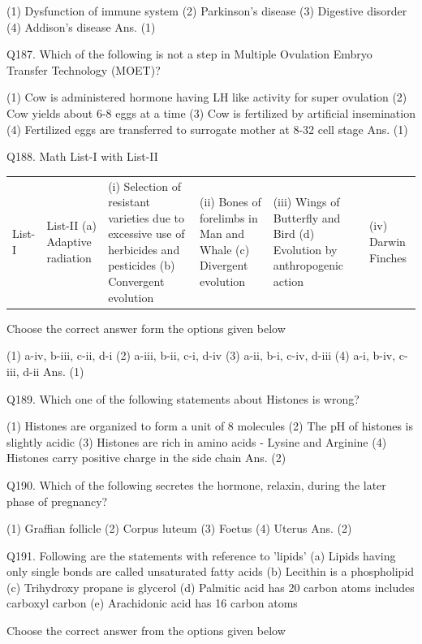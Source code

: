 \begin{enumerate}
(1) Dysfunction of immune system
(2) Parkinson's disease
(3) Digestive disorder
(4) Addison's disease
Ans. (1)

Q187. Which of the following is not a step in Multiple Ovulation Embryo Transfer Technology (MOET)?

(1) Cow is administered hormone having LH like activity for super ovulation
(2) Cow yields about 6-8 eggs at a time
(3) Cow is fertilized by artificial insemination
(4) Fertilized eggs are transferred to surrogate mother at 8-32 cell stage
Ans. (1)

Q188. Math List-I with List-II

\begin{center}
\begin{tabular}{|l|l|}
\hline
List-I & List-II 
\hline
(a) Adaptive radiation & (i) Selection of resistant varieties due to excessive use of herbicides and pesticides 
\hline
(b) Convergent evolution & (ii) Bones of forelimbs in Man and Whale 
\hline
(c) Divergent evolution & (iii) Wings of Butterfly and Bird 
\hline
(d) Evolution by anthropogenic action & (iv) Darwin Finches 
\hline
\end{tabular}
\end{center}

Choose the correct answer form the options given below

(1) a-iv, b-iii, c-ii, d-i
(2) a-iii, b-ii, c-i, d-iv
(3) a-ii, b-i, c-iv, d-iii
(4) a-i, b-iv, c-iii, d-ii
Ans. (1)

Q189. Which one of the following statements about Histones is wrong?

(1) Histones are organized to form a unit of 8 molecules
(2) The pH of histones is slightly acidic
(3) Histones are rich in amino acids - Lysine and Arginine
(4) Histones carry positive charge in the side chain
Ans. (2)


Q190. Which of the following secretes the hormone, relaxin, during the later phase of pregnancy?

(1) Graffian follicle
(2) Corpus luteum
(3) Foetus
(4) Uterus
Ans. (2)

Q191. Following are the statements with reference to 'lipids'
(a) Lipids having only single bonds are called unsaturated fatty acids
(b) Lecithin is a phospholipid
(c) Trihydroxy propane is glycerol
(d) Palmitic acid has 20 carbon atoms includes carboxyl carbon
(e) Arachidonic acid has 16 carbon atoms

Choose the correct answer from the options given below


\end{enumerate}
